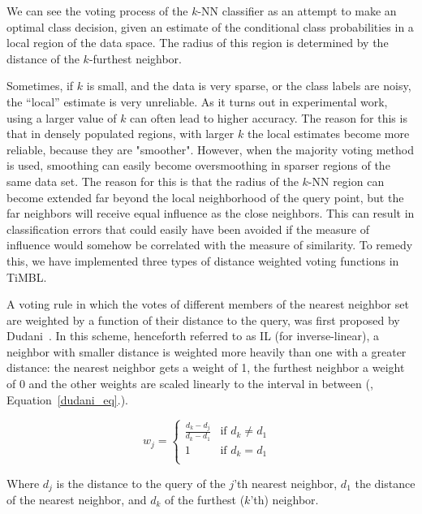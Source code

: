\documentclass{book}
\begin{document}
We can see the voting process of the $k$-NN classifier as an attempt
to make an optimal class decision, given an estimate of the
conditional class probabilities in a local region of the data space.
The radius of this region is determined by the distance of the
$k$-furthest neighbor.

Sometimes, if $k$ is small, and the data is very sparse, or the class
labels are noisy, the ``local'' estimate is very unreliable.  As it
turns out in experimental work, using a larger value of $k$ can often
lead to higher accuracy. The reason for this is that in densely
populated regions, with larger $k$ the local estimates become more
reliable, because they are "smoother".  However, when the majority
voting method is used, smoothing can easily become oversmoothing in
sparser regions of the same data set. The reason for this is that the
radius of the $k$-NN region can become extended far beyond the local
neighborhood of the query point, but the far neighbors will receive
equal influence as the close neighbors. This can result in
classification errors that could easily have been avoided if the
measure of influence would somehow be correlated with the measure of
similarity. To remedy this, we have implemented three types of distance 
weighted voting functions in TiMBL.

A voting rule in which the votes of different members of the nearest
neighbor set are weighted by a function of their distance to the
query, was first proposed by Dudani~. In this
scheme, henceforth referred to as IL (for inverse-linear), a neighbor
with smaller distance is weighted more heavily than one with a greater
distance: the nearest neighbor gets a weight of 1, the furthest
neighbor a weight of 0 and the other weights are scaled linearly to
the interval in between (, Equation~\ref{dudani_eq}.).

\begin{equation}
\label{dudani_eq}
w_{j}= \left \{ \begin{array}{ll}  
                        \frac{d_{k} - d_{j}}{d_{k} - d_{1}} & \mbox{if $d_{k}
\not= d_{1}$ } \\ 
                        1 & \mbox{if $d_{k} = d_{1}$}\\
                    \end{array} 
          \right. 
\end{equation}

Where $d_{j}$ is the distance to the query of the $j$'th nearest
neighbor, $d_{1}$ the distance of the nearest neighbor, and $d_{k}$ of
the furthest ($k$'th) neighbor.
\end{document}
